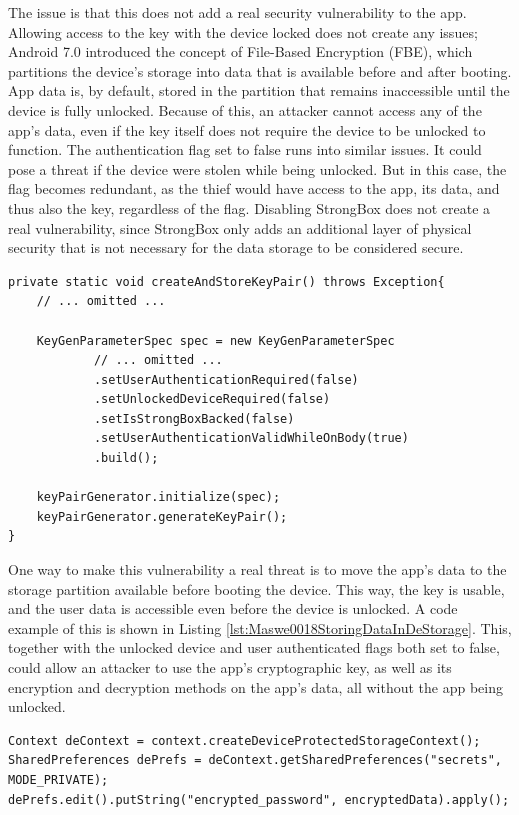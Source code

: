 The issue is that this does not add a real security vulnerability to the app. Allowing access to the key with the device locked does not create any issues; Android 7.0 introduced the concept of File-Based Encryption (FBE), which partitions the device's storage into data that is available before and after booting. App data is, by default, stored in the partition that remains inaccessible until the device is fully unlocked. Because of this, an attacker cannot access any of the app's data, even if the key itself does not require the device to be unlocked to function. The authentication flag set to false runs into similar issues. It could pose a threat if the device were stolen while being unlocked. But in this case, the flag becomes redundant, as the thief would have access to the app, its data, and thus also the key, regardless of the flag. Disabling StrongBox does not create a real vulnerability, since StrongBox only adds an additional layer of physical security that is not necessary for the data storage to be considered secure.


\begin{lstlisting}[style=JavaStyle, float=tbh, captionpos=b, caption={Removing any access-restricting settings from key generation parameters}, label={lst:Maswe0018AccessParameters}]
private static void createAndStoreKeyPair() throws Exception{
    // ... omitted ...
    
    KeyGenParameterSpec spec = new KeyGenParameterSpec
            // ... omitted ...
            .setUserAuthenticationRequired(false)
            .setUnlockedDeviceRequired(false)
            .setIsStrongBoxBacked(false)
            .setUserAuthenticationValidWhileOnBody(true)
            .build();

    keyPairGenerator.initialize(spec);
    keyPairGenerator.generateKeyPair();
}
\end{lstlisting}

One way to make this vulnerability a real threat is to move the app's data to the storage partition available before booting the device. This way, the key is usable, and the user data is accessible even before the device is unlocked. A code example of this is shown in Listing \ref{lst:Maswe0018StoringDataInDeStorage}. This, together with the unlocked device and user authenticated flags both set to false, could allow an attacker to use the app's cryptographic key, as well as its encryption and decryption methods on the app's data, all without the app being unlocked.

\begin{lstlisting}[style=JavaStyle, float=tbh, captionpos=b, caption={Storing encrypted user data in Device Encrypted (DE) storage}, label={lst:Maswe0018StoringDataInDeStorage}]
Context deContext = context.createDeviceProtectedStorageContext();
SharedPreferences dePrefs = deContext.getSharedPreferences("secrets", MODE_PRIVATE);
dePrefs.edit().putString("encrypted_password", encryptedData).apply();
\end{lstlisting}


